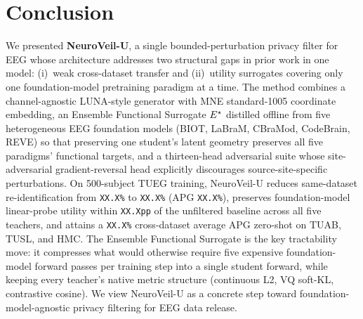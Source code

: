 \section{Conclusion}
\label{sec:conclusion}

We presented \textbf{NeuroVeil-U}, a single bounded-perturbation privacy filter for EEG whose architecture addresses two structural gaps in prior work in one model: (i)~weak cross-dataset transfer and (ii)~utility surrogates covering only one foundation-model pretraining paradigm at a time. The method combines a channel-agnostic LUNA-style generator with MNE standard-1005 coordinate embedding, an Ensemble Functional Surrogate $E^{\star}$ distilled offline from five heterogeneous EEG foundation models (BIOT, LaBraM, CBraMod, CodeBrain, REVE) so that preserving one student's latent geometry preserves all five paradigms' functional targets, and a thirteen-head adversarial suite whose site-adversarial gradient-reversal head explicitly discourages source-site-specific perturbations. On 500-subject TUEG training, NeuroVeil-U reduces same-dataset re-identification from \texttt{XX.X\%} to \texttt{XX.X\%} (APG \texttt{XX.X\%}), preserves foundation-model linear-probe utility within \texttt{XX.Xpp} of the unfiltered baseline across all five teachers, and attains a \texttt{XX.X\%} cross-dataset average APG zero-shot on TUAB, TUSL, and HMC. The Ensemble Functional Surrogate is the key tractability move: it compresses what would otherwise require five expensive foundation-model forward passes per training step into a single student forward, while keeping every teacher's native metric structure (continuous L2, VQ soft-KL, contrastive cosine). We view NeuroVeil-U as a concrete step toward foundation-model-agnostic privacy filtering for EEG data release.
